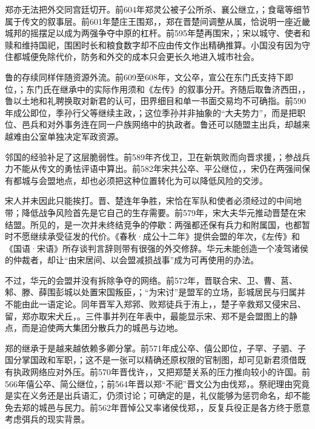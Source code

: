 郑亦无法把外交同宫廷切开。前604年郑灵公被子公所杀、襄公继立，；食鼋等细节属于传文的叙事层。前601年楚庄王围郑，，郑在晋楚间调整从属，恰说明一座近畿城邦的摇摆足以成为两强争夺中原的杠杆。前595年楚再围宋，；宋以城守、使者和赎和维持国祀，围困时长和粮食数字却不应由传文作出精确推算。小国没有因为守住都城便免除代价，防务和外交的成本只会更长久地进入城市社会。

鲁的存续同样伴随资源外流。前609至608年，文公卒，宣公在东门氏支持下即位，；东门氏在继承中的实际作用须和《左传》的叙事分开。齐随后取鲁济西田，，鲁以土地和礼聘换取对新君的认可，田界细目和单一书面交易均不可确指。前590年成公即位，季孙行父等继续主政，；这位季孙并非抽象的“大夫势力”，而是把职位、邑兵和对外事务连在同一户族网络中的执政者。鲁还可以随盟主出兵，却越来越难由公室单独决定军政资源。

邻国的经验补足了这层脆弱性。前589年齐伐卫，卫在新筑败而向晋求援，；参战兵力不能从传文的勇怯评语中算出。前582年宋共公卒、平公继位，，宋仍在两强间保有都城与会盟地点，却也必须把这种位置转化为可以降低风险的交涉。

宋人并未因此只能挨打。晋、楚连年争胜，宋恰在军队和使者必须经过的中间地带；降低战争风险首先是它自己的生存需要。前579年，宋大夫华元推动晋楚在宋结盟。所见的，是一次并未终结竞争的停歇：两强都还保有兵力和附属国，也都暂时不愿继续承受征发的代价。《春秋·成公十二年》提供会盟的年次，《左传》和《国语·宋语》所存谈判言辞则带有很强的外交修辞。华元未能创造一个凌驾诸侯的仲裁者，却让“由宋居间、以会盟减损战事”成为可再使用的办法。

不过，华元的会盟并没有拆除争夺的网络。前572年，晋联合宋、卫、曹、莒、邾、滕、薛围彭城以处置宋国叛臣，；“为宋讨”是盟军的立场，彭城居民与归属并不能由此一语定论。同年晋军入郑郛、败郑徒兵于洧上，，楚子辛救郑又侵宋吕、留，郑亦取宋犬丘，。三件事并列在年表中，最能显示宋、郑不是会盟图上的静点，而是迫使两大集团分散兵力的城邑与边地。

郑的继承于是越来越依赖多卿分掌。前571年成公卒、僖公即位，子罕、子驷、子国分掌国政和军职，；这不是一张可以精确还原权限的官制图，却可见新君须借既有执政网络应对外压。前570年晋伐许，，又把郑楚关系的压力推向较小的许国。前566年僖公卒、简公继位，；前564年晋以郑“不祀”晋文公为由伐郑，。祭祀理由究竟是实在义务还是出兵语汇，仍须讨论；可确定的是，礼仪能够为惩罚命名，却不能免去郑的城邑与民力。前562年晋悼公又率诸侯伐郑，，反复兵役正是各方终于愿意考虑弭兵的现实背景。

